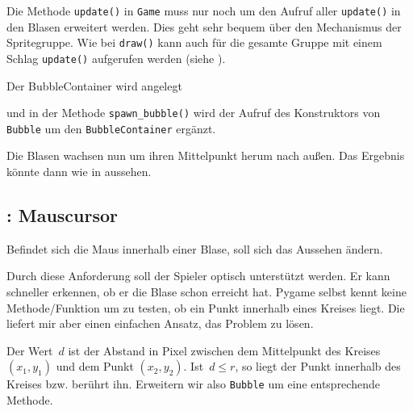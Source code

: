 
Die Methode \texttt{update()} in \texttt{Game} muss nur noch um den Aufruf aller \texttt{update()} in den Blasen erweitert werden. Dies geht sehr bequem über den Mechanismus der Spritegruppe. Wie bei \texttt{draw()} kann auch für die gesamte Gruppe mit einem Schlag \texttt{update()} aufgerufen werden (siehe ).


Der BubbleContainer wird angelegt


und in der Methode \texttt{spawn\_bubble()} wird der Aufruf des Konstruktors von \texttt{Bubble} um den \texttt{BubbleContainer} ergänzt.


Die Blasen wachsen nun um ihren Mittelpunkt herum nach außen. Das Ergebnis könnte dann wie in  aussehen.


\subsection{: Mauscursor}
    Befindet sich die Maus innerhalb einer Blase, soll sich das Aussehen ändern.
\er

Durch diese Anforderung soll der Spieler optisch unterstützt werden. Er kann schneller erkennen, ob er die Blase schon erreicht hat. Pygame selbst kennt keine Methode/Funktion um zu testen, ob ein Punkt innerhalb eines Kreises liegt. Die  liefert mir aber einen einfachen Ansatz, das Problem zu lösen. 

Der Wert~$d$ ist der Abstand in Pixel zwischen dem Mittelpunkt des Kreises $(x_1, y_1)$ und dem Punkt $(x_2, y_2)$. Ist~$d \leq r$, so liegt der Punkt innerhalb des Kreises bzw. berührt ihn. Erweitern wir also \texttt{Bubble} um eine entsprechende Methode.

